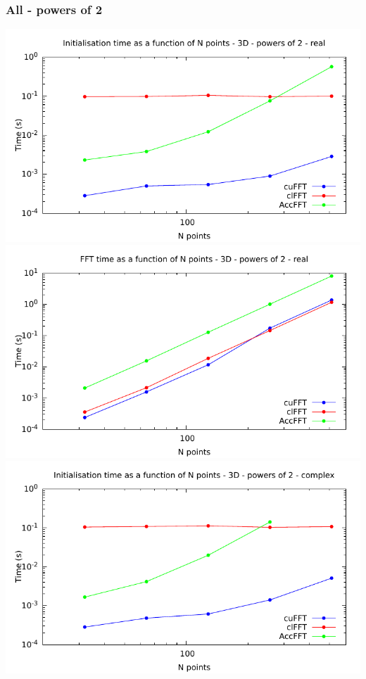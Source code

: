 \documentclass[12pt, a4paper]{article}
\begin{document}
\subsubsection{All - powers of 2}
\includegraphics[height=8cm]{graphs/fft-3d-pow2-r-init.pdf}\\
\includegraphics[height=8cm]{graphs/fft-3d-pow2-r-exec.pdf}\\
\includegraphics[height=8cm]{graphs/fft-3d-pow2-c-init.pdf}\\
\end{document}
